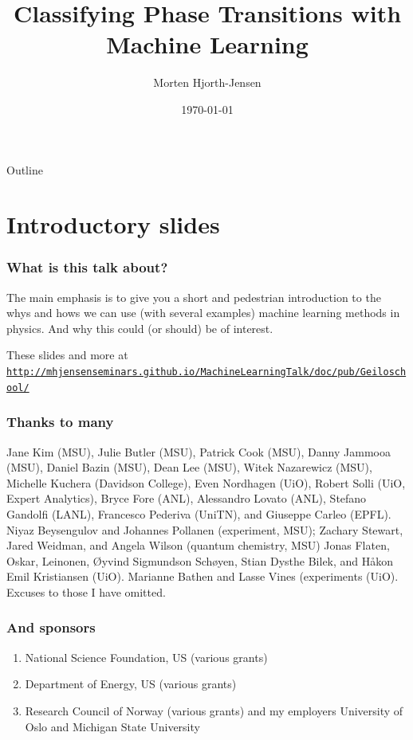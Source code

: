 \documentclass{beamer}
\title{Classifying Phase Transitions with Machine Learning}
\author{Morten Hjorth-Jensen}
\date{\today}
\begin{document}
\begin{frame}
 \titlepage
\end{frame}

\begin{frame}{Outline}
 \tableofcontents
\end{frame}


\section{Introductory slides}

\begin{frame}
\frametitle{What is this talk about?}

\begin{block}{}
The main emphasis is to give you a short and pedestrian introduction to the whys and hows we can use (with several examples) machine learning methods
in physics. And why this could (or should) be of interest. 
\end{block}

\begin{block}{}
These slides and more at \href{{http://mhjensenseminars.github.io/MachineLearningTalk/doc/pub/Geiloschool/}}{\nolinkurl{http://mhjensenseminars.github.io/MachineLearningTalk/doc/pub/Geiloschool/}}
\end{block}
\end{frame}

\begin{frame}
\frametitle{Thanks to many}

Jane Kim (MSU), Julie Butler (MSU), Patrick Cook (MSU), Danny Jammooa (MSU), Daniel Bazin (MSU), Dean Lee (MSU), Witek Nazarewicz (MSU), Michelle Kuchera (Davidson College), Even Nordhagen (UiO), Robert Solli (UiO, Expert Analytics), Bryce Fore (ANL), Alessandro Lovato (ANL), Stefano Gandolfi (LANL), Francesco Pederiva (UniTN), and Giuseppe Carleo (EPFL). 
Niyaz Beysengulov and Johannes Pollanen (experiment, MSU); Zachary Stewart, Jared Weidman, and Angela Wilson (quantum chemistry, MSU)
Jonas Flaten, Oskar, Leinonen, Øyvind Sigmundson Schøyen, Stian Dysthe Bilek, and Håkon Emil Kristiansen (UiO). Marianne Bathen and Lasse Vines (experiments (UiO). Excuses to those I have omitted.
\end{frame}

\begin{frame}
\frametitle{And sponsors}

\begin{enumerate}
\item National Science Foundation, US (various grants)

\item Department of Energy, US (various grants)

\item Research Council of Norway (various grants) and my employers University of Oslo and Michigan State University
\end{enumerate}

\noindent
\end{frame}
\end{document}
